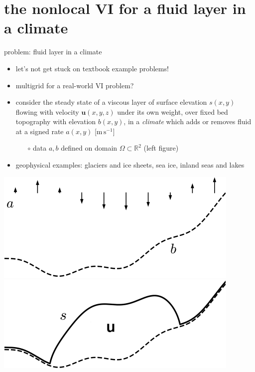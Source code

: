 \documentclass[svgnames,
               hyperref={colorlinks,citecolor=DeepPink4,linkcolor=FireBrick,urlcolor=Maroon},
               usepdftitle=false]  %
               {beamer}
\newcommand{\RR}{\mathbb{R}}
\newcommand{\bu}{\mathbf{u}}
\begin{document}
\section{the nonlocal VI for a fluid layer in a climate}

\begin{frame}{problem: fluid layer in a climate}

\begin{itemize}
\item let's not get stuck on textbook example problems!
\item multigrid for a real-world VI problem?
\item consider the steady state of a viscous layer of surface elevation $s(x,y)$ flowing with velocity $\bu(x,y,z)$ under its own weight, over fixed bed topography with elevation $b(x,y)$, in a \emph{climate} which adds or removes fluid at a signed rate $a(x,y)$ [$\text{m}\,\text{s}^{-1}$]
    \begin{itemize}
    \item[$\circ$] data $a,b$ defined on domain $\Omega \subset \RR^2$ (left figure)
    \end{itemize}
\item geophysical examples: \alert{glaciers and ice sheets}, sea ice, inland seas and lakes
\end{itemize}

\bigskip
\hfill \mbox{\includegraphics[height=0.25\textheight]{images/domain-data.png} \hspace{7mm} \includegraphics[height=0.25\textheight]{images/domain-velocity.png}}
\end{frame}
\end{document}
